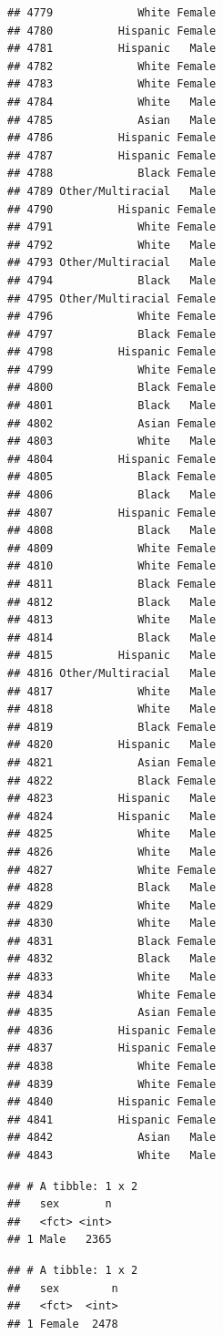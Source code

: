 \documentclass[man]{apa6}
\begin{document}
\begin{verbatim}
## 4779             White Female
## 4780          Hispanic Female
## 4781          Hispanic   Male
## 4782             White Female
## 4783             White Female
## 4784             White   Male
## 4785             Asian   Male
## 4786          Hispanic Female
## 4787          Hispanic Female
## 4788             Black Female
## 4789 Other/Multiracial   Male
## 4790          Hispanic Female
## 4791             White Female
## 4792             White   Male
## 4793 Other/Multiracial   Male
## 4794             Black   Male
## 4795 Other/Multiracial Female
## 4796             White Female
## 4797             Black Female
## 4798          Hispanic Female
## 4799             White Female
## 4800             Black Female
## 4801             Black   Male
## 4802             Asian Female
## 4803             White   Male
## 4804          Hispanic Female
## 4805             Black Female
## 4806             Black   Male
## 4807          Hispanic Female
## 4808             Black   Male
## 4809             White Female
## 4810             White Female
## 4811             Black Female
## 4812             Black   Male
## 4813             White   Male
## 4814             Black   Male
## 4815          Hispanic   Male
## 4816 Other/Multiracial   Male
## 4817             White   Male
## 4818             White   Male
## 4819             Black Female
## 4820          Hispanic   Male
## 4821             Asian Female
## 4822             Black Female
## 4823          Hispanic   Male
## 4824          Hispanic   Male
## 4825             White   Male
## 4826             White   Male
## 4827             White Female
## 4828             Black   Male
## 4829             White   Male
## 4830             White   Male
## 4831             Black Female
## 4832             Black   Male
## 4833             White   Male
## 4834             White Female
## 4835             Asian Female
## 4836          Hispanic Female
## 4837          Hispanic Female
## 4838             White Female
## 4839             White Female
## 4840          Hispanic Female
## 4841          Hispanic Female
## 4842             Asian   Male
## 4843             White   Male
\end{verbatim}

\begin{verbatim}
## # A tibble: 1 x 2
##   sex       n
##   <fct> <int>
## 1 Male   2365
\end{verbatim}

\begin{verbatim}
## # A tibble: 1 x 2
##   sex        n
##   <fct>  <int>
## 1 Female  2478
\end{verbatim}
\end{document}
